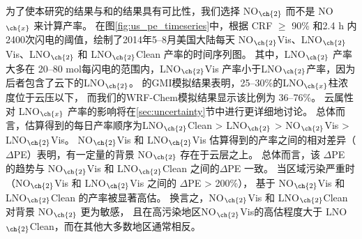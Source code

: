 为了使本研究的结果与\citet{Pickering.2016}和\citet{Lapierre.2020}的结果具有可比性，我们选择 NO$_{\ch{2}}$  而不是 NO$_{\ch{x}}$  来计算产率。
在图\ref{fig:us_pe_timeseries}中，根据 CRF $\geq$ 90\% 和2.4 h 内2400次闪电的阈值，绘制了2014年5--8月美国大陆每天 NO$_{\ch{2}}$Vis、LNO$_{\ch{2}}$Vis、LNO$_{\ch{2}}$ 和 LNO$_{\ch{2}}$Clean 产率的时间序列图。
其中，LNO$_{\ch{2}}$ 产率大多在 20--80 mol每闪电的范围内，LNO$_{\ch{2}}$Vis 产率小于LNO$_{\ch{2}}$产率，因为后者包含了云下的LNO$_{\ch{2}}$。
\citet{Pickering.2016}的GMI模拟结果表明，25--30\%的LNO$_{\ch{x}}$柱浓度位于云压以下，
而我们的WRF-Chem模拟结果显示该比例为 36--76\%。
云属性对 LNO$_{\ch{x}}$ 产率的影响将在\ref{sec:uncertainty}节中进行更详细地讨论。
总体而言，估算得到的每日产率顺序为LNO$_{\ch{2}}$Clean > LNO$_{\ch{2}}$ > NO$_{\ch{2}}$Vis > LNO$_{\ch{2}}$Vis。
NO$_{\ch{2}}$Vis 和 LNO$_{\ch{2}}$Vis 估算得到的产率之间的相对差异（$\Delta$PE）表明，有一定量的背景 NO$_{\ch{2}}$ 存在于云层之上。
总体而言，该 $\Delta$PE 的趋势与 NO$_{\ch{2}}$Vis 和 LNO$_{\ch{2}}$Clean 之间的$\Delta$PE 一致。
当区域污染严重时（NO$_{\ch{2}}$Vis 和 LNO$_{\ch{2}}$Vis 之间的 $\Delta$PE > 200\%），
基于 NO$_{\ch{2}}$Vis 和 LNO$_{\ch{2}}$Clean 的产率被显著高估。
换言之，NO$_{\ch{2}}$Vis 和 LNO$_{\ch{2}}$Clean 对背景 NO$_{\ch{2}}$ 更为敏感，
且在高污染地区NO$_{\ch{2}}$Vis的高估程度大于 LNO$_{\ch{2}}$Clean，而在其他大多数地区通常相反。


